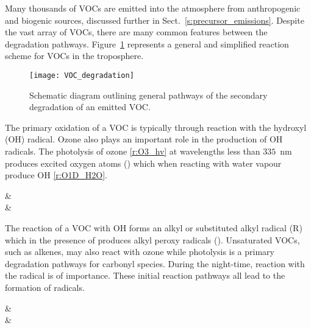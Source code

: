 Many thousands of VOCs are emitted into the atmosphere from anthropogenic and biogenic sources, discussed further in Sect.~\ref{s:precursor_emissions}. 
Despite the vast array of VOCs, there are many common features between the degradation pathways.
Figure~\ref{f:VOC_reaction} represents a general and simplified reaction scheme for VOCs in the troposphere. 
\begin{figure}[t]
    \begin{center}
        \caption[Schematic of general secondary degradation of VOCs]{Schematic diagram outlining general pathways of the secondary degradation of an emitted VOC.}
        \texttt{[image: VOC\_degradation]}
        \label{f:VOC_reaction}
    \end{center}
\end{figure}

The primary oxidation of a VOC is typically through reaction with the hydroxyl (OH) radical.
Ozone also plays an important role in the production of OH radicals.
The photolysis of ozone \eqref{r:O3_hv} at wavelengths less than $335$~nm produces excited oxygen atoms () which when reacting with water vapour produce OH \eqref{r:O1D_H2O}.
\begin{rxnarray}
     & \rightarrow {} \label{r:O3_hv} \\
     & \rightarrow {} \label{r:O1D_H2O}
\end{rxnarray}

The reaction of a VOC with OH forms an alkyl or substituted alkyl radical (R) which in the presence of  produces alkyl peroxy radicals ().
Unsaturated VOCs, such as alkenes, may also react with ozone while photolysis is a primary degradation pathways for carbonyl species.
During the night-time, reaction with the  radical is of importance.
These initial reaction pathways all lead to the formation of  radicals.
\begin{rxnarray}
     & \rightarrow {} \label{r:VOC_init} \\
     & \rightarrow {} \label{r:R_O2}
\end{rxnarray} 

